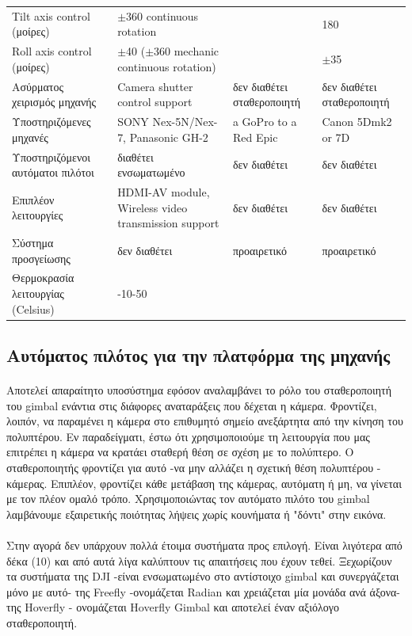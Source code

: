 \documentclass[a4paper, 12pt, twoside]{report}
\begin{document}
{{{{{{\begin{landscape}
\begin{longtable} { m{3cm} m{3.5cm} m{3.5cm} m{3.5cm}}
					Tilt axis control (μοίρες) & $\pm$360 continuous rotation & & 180\\
					Roll axis control (μοίρες) & $\pm$40 ($\pm$360 mechanic continuous rotation) & & $\pm$35\\
					\hdashline
					Ασύρματος χειρισμός μηχανής & Camera shutter control support & δεν διαθέτει σταθεροποιητή & δεν διαθέτει σταθεροποιητή\\
					\hdashline
					Υποστηριζόμενες μηχανές & SONY Nex-5N/Nex-7, Panasonic GH-2 & a GoPro to a Red Epic & Canon 5Dmk2 or 7D\\
					\hdashline
					Υποστηριζόμενοι αυτόματοι πιλότοι & διαθέτει ενσωματωμένο & δεν διαθέτει & δεν διαθέτει\\
					\hdashline
					Επιπλέον λειτουργίες & HDMI-AV module, Wireless video transmission support & δεν διαθέτει & δεν διαθέτει\\
					\hdashline
					Σύστημα προσγείωσης & δεν διαθέτει & προαιρετικό & προαιρετικό\\
					\hdashline
					Θερμοκρασία λειτουργίας (Celsius) & -10-50 & & \\
					\hline
				\end{longtable}
				\end{landscape}
			
		\subsection{Αυτόματος πιλότος για την πλατφόρμα της μηχανής}
			\paragraph{}{Αποτελεί απαραίτητο υποσύστημα εφόσον αναλαμβάνει το ρόλο του σταθεροποιητή του gimbal ενάντια στις διάφορες αναταράξεις που δέχεται η κάμερα. Φροντίζει, λοιπόν, να παραμένει η κάμερα στο επιθυμητό σημείο ανεξάρτητα από την κίνηση του πολυπτέρου. Εν παραδείγματι, έστω ότι χρησιμοποιούμε τη λειτουργία που μας επιτρέπει η κάμερα να κρατάει σταθερή θέση σε σχέση με το πολύπτερο. Ο σταθεροποιητής φροντίζει για αυτό -να μην αλλάζει η σχετική θέση πολυπτέρου - κάμερας. Επιπλέον, φροντίζει κάθε μετάβαση της κάμερας, αυτόματη ή μη, να γίνεται με τον πλέον ομαλό τρόπο. Χρησιμοποιώντας τον αυτόματο πιλότο του gimbal λαμβάνουμε εξαιρετικής ποιότητας λήψεις χωρίς κουνήματα ή "δόντι" στην εικόνα.
			}
			\paragraph{}{Στην αγορά δεν υπάρχουν πολλά έτοιμα συστήματα προς επιλογή. Είναι λιγότερα από δέκα (10) και από αυτά λίγα καλύπτουν τις απαιτήσεις που έχουν τεθεί. Ξεχωρίζουν τα συστήματα της DJI -είναι ενσωματωμένο στο αντίστοιχο gimbal και συνεργάζεται μόνο με αυτό- της Freefly -ονομάζεται Radian και χρειάζεται μία μονάδα ανά άξονα- της Hoverfly - ονομάζεται Hoverfly Gimbal και αποτελεί έναν αξιόλογο σταθεροποιητή.
			}
			
}}}}}}
\end{document}
